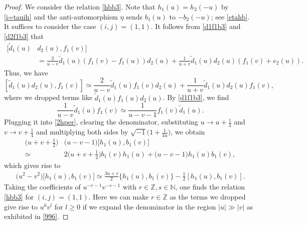 \documentclass[10pt,a4paper]{amsart}
\def \Z{\mathbb{Z}}
\newcommand{\bN}{\mathbb{N}}
\newcommand{\bZ}{\mathbb{Z}}
\newcommand{\beq}{\begin{equation}}
\newcommand{\eeq}{\end{equation}}
\newcommand{\gge}{\geqslant}
\newcommand{\tl}{\tilde}
\begin{document}
\begin{proof}
We consider the relation \eqref{hbb3}. Note that $h_1(u)=h_2(-u)$ by \eqref{i=tauih} and the anti-automorphism $\eta$ sends $b_1(u)$ to $-b_2(-u)$; see \eqref{etahb}. It suffices to consider the case $(i,j)=(1,1)$. It follows from \eqref{d1f1b3} and \eqref{d2f1b3} that
\beq\label{1helper}
\begin{split}
[\tl d_1(u)&d_2(u),f_1(v)]\\&=\frac{2}{u-v}\tl d_1(u)(f_1(v)-f_1(u))d_2(u)+\frac{1}{u+v}\tl d_1(u)d_2(u)(f_1(v)+e_2(u)).    
\end{split}
\eeq
Thus, we have
\beq\label{2hper}
[\tl d_1(u)d_2(u),f_1(v)]\simeq\frac{2}{u-v}\tl d_1(u)f_1(v)d_2(u)+\frac{1}{u+v}\tl d_1(u)d_2(u)f_1(v),
\eeq
where we dropped terms like $\tl d_1(u)f_1(u)d_2(u)$. By \eqref{d1f1b3}, we find
\[
\frac{1}{u-v}\tl d_1(u)f_1(v)\simeq \frac{1}{u-v-1}f_1(v)\tl d_1(u).
\]
Plugging it into \eqref{2hper}, clearing the denominator, substituting $u\to u+\frac14$ and $v\to v+\frac14$ and multiplying both sides by $\sqrt{-1}\big(1+\frac{1}{4u}\big)$, we obtain
\begin{align*}
\big(u+v+\tfrac{1}{2}\big)&\big(u-v-1\big)\big[h_1(u),b_1(v)\big]\\
\simeq\,&2 \big(u+v+\tfrac{1}{2}\big)b_1(v)h_1(u)+ \big(u-v-1\big)h_1(u)b_1(v),
\end{align*}
which gives rise to
\begin{align*}
\big(u^2-v^2\big)\big[h_1(u),b_1(v)\big]
\simeq \frac{3u+v}{2} \big\{h_1(u),b_1(v)\big\}-\frac{1}{2}[h_1(u),b_1(v)].                               
\end{align*}
Taking the coefficients of $u^{-r-1}v^{-s-1}$  with $r\in\bZ,s\in\bN$, one finds the relation \eqref{hbb3} for $(i,j)=(1,1)$. Here we can make $r\in\Z$ as the terms we dropped give rise to $u^{k}v^{l}$ for $l\gge 0$ if we expand the denominator in the region $|u|\gg |v|$ as exhibited in \eqref{996}.
\end{proof}
\end{document}
